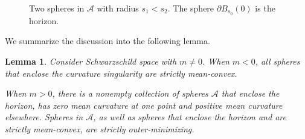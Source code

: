 \documentclass[12pt,twoside]{article}
\theoremstyle{plain}
\newtheorem{lem}[theorem]{Lemma}
\theoremstyle{definition}
\theoremstyle{remark}
\newcommand{\pl}{\partial}
\numberwithin{equation}{section}
\begin{document}
\begin{figure}
\centering
{}
\caption{Two spheres in $\mathcal{A}$ with radius $s_1 < s_2$. The sphere $\pl B_{s_0}(0)$ is the horizon.}
\label{spheres}
\end{figure}

We summarize the discussion into the following lemma.
\begin{lem}\label{property of spheres}
Consider Schwarzschild space with $m \neq 0$. When $m < 0$, all spheres that enclose the curvature singularity are strictly mean-convex. 

When $m> 0$, there is a nonempty collection of spheres $\mathcal{A}$ that enclose the horizon, has zero mean curvature at one point and positive mean curvature elsewhere. Spheres in $\mathcal{A}$, as well as spheres that enclose the horizon and are strictly mean-convex, are strictly outer-minimizing.  
\end{lem}
 
\end{document}
